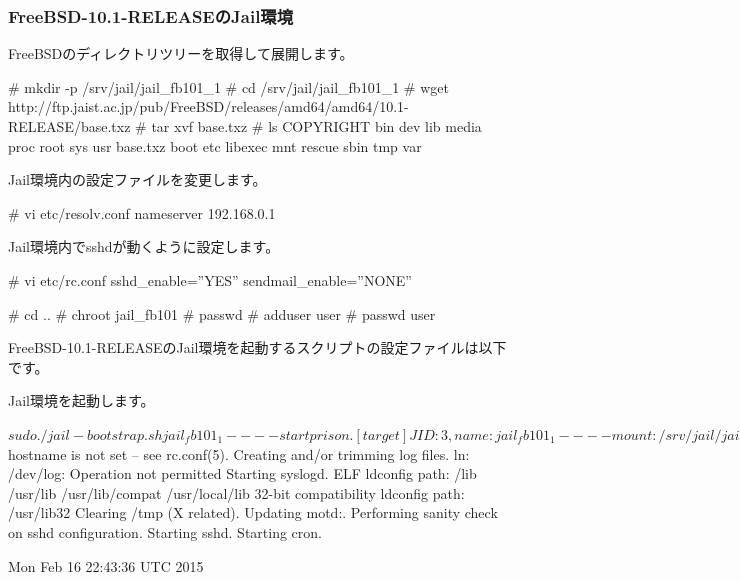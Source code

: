 \documentclass[mingoth,a4paper]{jsarticle}
\begin{document}
\subsubsection{FreeBSD-10.1-RELEASEのJail環境}

FreeBSDのディレクトリツリーを取得して展開します。

\begin{commandline}
# mkdir -p /srv/jail/jail_fb101_1
# cd /srv/jail/jail_fb101_1
# wget http://ftp.jaist.ac.jp/pub/FreeBSD/releases/amd64/amd64/10.1-RELEASE/base.txz
# tar xvf base.txz
# ls
COPYRIGHT  bin dev  lib      media  proc    root  sys  usr
base.txz   boot  etc  libexec  mnt    rescue  sbin  tmp  var
\end{commandline}

Jail環境内の設定ファイルを変更します。

\begin{commandline}
# vi etc/resolv.conf
nameserver 192.168.0.1
\end{commandline}

Jail環境内でsshdが動くように設定します。

\begin{commandline}
# vi etc/rc.conf
sshd_enable=''YES''
sendmail_enable=''NONE''

# cd ..
# chroot jail_fb101
# passwd
# adduser user
# passwd user
\end{commandline}

FreeBSD-10.1-RELEASEのJail環境を起動するスクリプトの設定ファイルは以下です。


Jail環境を起動します。

\begin{commandline}
$ sudo ./jail-bootstrap.sh jail_fb101_1

----
start prison.
[target] JID: 3, name: jail_fb101_1
----

mount: /srv/jail/jail_fb101_1/usr/src/sys: No such file or directory
mount: /srv/jail/jail_fb101_1/run: No such file or directory
devfs rule: ioctl DEVFSIO_SAPPLY: No such process
/etc/rc: WARNING: $hostname is not set -- see rc.conf(5).
Creating and/or trimming log files.
ln: /dev/log: Operation not permitted
Starting syslogd.
ELF ldconfig path: /lib /usr/lib /usr/lib/compat /usr/local/lib
32-bit compatibility ldconfig path: /usr/lib32
Clearing /tmp (X related).
Updating motd:.
Performing sanity check on sshd configuration.
Starting sshd.
Starting cron.

Mon Feb 16 22:43:36 UTC 2015
\end{commandline}
\end{document}
